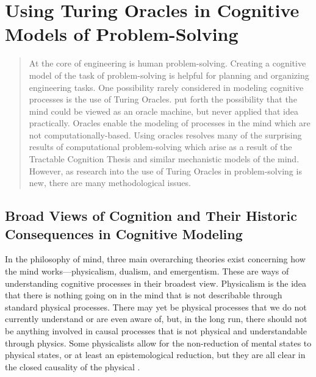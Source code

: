 \chapter[Using Turing Oracles]{Using Turing Oracles in Cognitive Models of Problem-Solving}


\begin{abstract}
At the core of engineering is human problem-solving.  Creating a cognitive model of the task of problem-solving is helpful for planning and organizing engineering tasks.  One possibility rarely considered in modeling cognitive processes is the use of Turing Oracles.  \citet{copeland1998} put forth the possibility that the mind could be viewed as an oracle machine, but never applied that idea practically.  Oracles enable the modeling of processes in the mind which are not computationally-based.  Using oracles resolves many of the surprising results of computational problem-solving which arise as a result of the Tractable Cognition Thesis and similar mechanistic models of the mind.  However, as research into the use of Turing Oracles in problem-solving is new, there are many methodological issues.
\end{abstract}

\section[Broad Views of Cognition]{Broad Views of Cognition and Their Historic Consequences in Cognitive Modeling}

In the philosophy of mind, three main overarching theories exist concerning how the mind works---physicalism, dualism, and emergentism.  These are ways of understanding cognitive processes in their broadest view.  Physicalism is the idea that there is nothing going on in the mind that is not describable through standard physical processes.  There may yet be physical processes that we do not currently understand or are even aware of, but, in the long run, there should not be anything involved in causal processes that is not physical and understandable through physics.  Some physicalists allow for the non-reduction of mental states to physical states, or at least an epistemological reduction, but they are all clear in the closed causality of the physical \citep{horgan1994}.

